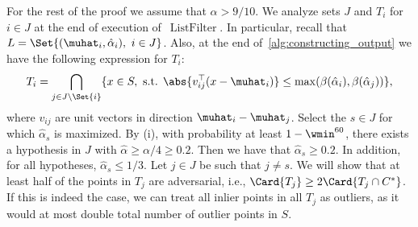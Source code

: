 \noindent
For the rest of the proof we assume that \(\alpha > 9/10\).
We analyze sets \(J\) and \(T_i\) for \(i \in J\) at the end of execution of~\(\operatorname{ListFilter}\).
In particular, recall that \(L = \Set{(\muhat_i, \hat \alpha_i),\ i \in J}\).
Also, at the end of~\cref{alg:constructing_output} we have the following expression for \(T_i\):
\begin{equation*}
    T_i = \bigcap_{j \in J \setminus \Set{i}}\{x \in S, \text{ s.t. } \abs{v_{ij}^{\top}(x - \muhat_i)} \leq \max(\beta(\hat\alpha_i), \beta(\hat\alpha_j))\},
\end{equation*}
where \(v_{ij}\) are unit vectors in direction \(\muhat_i - \muhat_j\).
Select the $s \in J$ for which $\hat\alpha_s$ is maximized.
By (i), with probability at least $1-\wmin^{60}$, there exists a hypothesis in $J$ with $\hat\alpha \geq \alpha/4 \geq 0.2$.
Then we have that $\hat\alpha_s \geq 0.2$.
In addition, for all hypotheses, $\hat\alpha_s \leq 1/3$.
Let \(j \in J\) be such that \(j \neq s\).
We will show that at least half of the points in \(T_j\) are adversarial, i.e., \(\Card{T_j} \geq 2 \Card{T_j \cap C^{\ast}}\). 
If this is indeed the case, we can treat all inlier points in all \(T_j\) as outliers, 
as it would at most double total number of outlier points in \(S\).

